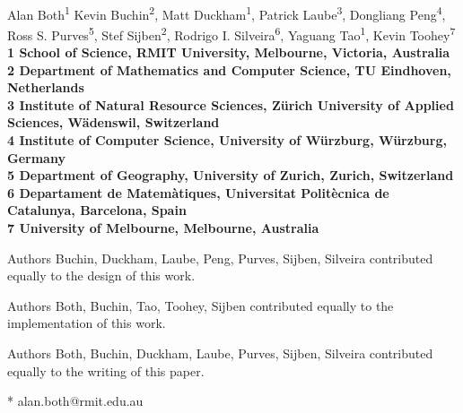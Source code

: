 \documentclass[10pt,letterpaper]{article}
\date{}
\begin{document}
\vspace*{0.2in}

\begin{flushleft}
{\Large
\textbf{} %
}
\newline
\\
Alan Both\textsuperscript{1}
Kevin Buchin\textsuperscript{2},
Matt Duckham\textsuperscript{1},
Patrick Laube\textsuperscript{3},
Dongliang Peng\textsuperscript{4},
Ross S. Purves\textsuperscript{5},
Stef Sijben\textsuperscript{2},
Rodrigo I. Silveira\textsuperscript{6},
Yaguang Tao\textsuperscript{1},
Kevin Toohey\textsuperscript{7}
\\
\bf{1} School of Science, RMIT University, Melbourne, Victoria, Australia
\\
\bf{2} Department of Mathematics and Computer Science, TU Eindhoven, Netherlands
\\
\bf{3} Institute of Natural Resource Sciences, Z\"urich University of Applied Sciences, W\"adenswil, Switzerland
\\
\bf{4} Institute of Computer Science, University of W\"urzburg, W\"urzburg, Germany
\\
\bf{5} Department of Geography, University of Zurich, Zurich, Switzerland
\\
\bf{6} Departament de Matemàtiques, Universitat Politècnica de Catalunya, Barcelona, Spain
\\
\bf{7} University of Melbourne, Melbourne, Australia
\\

\bigskip

% 
%
Authors Buchin, Duckham, Laube, Peng, Purves, Sijben, Silveira contributed equally to the design of this work.

Authors Both, Buchin, Tao, Toohey, Sijben contributed equally to the implementation of this work.

Authors Both, Buchin, Duckham, Laube, Purves, Sijben, Silveira contributed equally to the writing of this paper. 

* alan.both@rmit.edu.au

\end{flushleft}
\end{document}
